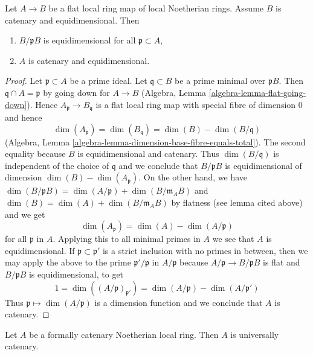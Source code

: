 \begin{lemma}
\label{lemma-flat-under-catenary-equidimensional}
Let $A \to B$ be a flat local ring map of local Noetherian rings.
Assume $B$ is catenary and equidimensional. Then
\begin{enumerate}
\item $B/\mathfrak p B$ is equidimensional for all $\mathfrak p \subset A$,
\item $A$ is catenary and equidimensional.
\end{enumerate}
\end{lemma}

\begin{proof}
Let $\mathfrak p \subset A$ be a prime ideal. Let $\mathfrak q \subset B$
be a prime minimal over $\mathfrak pB$. Then $\mathfrak q \cap A = \mathfrak p$
by going down for $A \to B$
(Algebra, Lemma \ref{algebra-lemma-flat-going-down}).
Hence $A_\mathfrak p \to B_\mathfrak q$ is a flat local ring map
with special fibre of dimension $0$ and hence
$$
\dim(A_\mathfrak p) = \dim(B_\mathfrak q) = \dim(B) - \dim(B/\mathfrak q)
$$
(Algebra, Lemma \ref{algebra-lemma-dimension-base-fibre-equals-total}).
The second equality because $B$ is equidimensional and catenary.
Thus $\dim(B/\mathfrak q)$ is independent of the choice of $\mathfrak q$
and we conclude that $B/\mathfrak p B$ is equidimensional of
dimension $\dim(B) - \dim(A_\mathfrak p)$. On the other hand, we
have
$\dim(B/\mathfrak p B) = \dim(A/\mathfrak p) + \dim(B/\mathfrak m_A B)$
and
$\dim(B) = \dim(A) + \dim(B/\mathfrak m_A B)$
by flatness (see lemma cited above) and we get
$$
\dim(A_\mathfrak p) = \dim(A) - \dim(A/\mathfrak p)
$$
for all $\mathfrak p$ in $A$. Applying this to all minimal primes in
$A$ we see that $A$ is equidimensional.
If $\mathfrak p \subset \mathfrak p'$ is a strict inclusion
with no primes in between, then we may apply the above to
the prime $\mathfrak p'/\mathfrak p$ in $A/\mathfrak p$
because $A/\mathfrak p \to B/\mathfrak p B$ is flat and
$B/\mathfrak p B$ is equidimensional, to get
$$
1 = \dim((A/\mathfrak p)_{\mathfrak p'}) =
\dim(A/\mathfrak p) - \dim(A/\mathfrak p')
$$
Thus $\mathfrak p \mapsto \dim(A/\mathfrak p)$ is a dimension
function and we conclude that $A$ is catenary.
\end{proof}

\begin{lemma}
\label{lemma-formally-catenary}
Let $A$ be a formally catenary Noetherian local ring.
Then $A$ is universally catenary.
\end{lemma}


